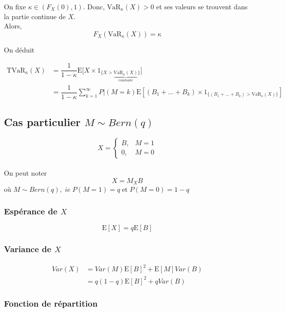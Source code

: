 On fixe \(\kappa \in (F_{X}(0),1)\). Donc, \(\text{VaR}_\kappa (X) >0\)
et ses valeurs se trouvent dans la partie continue de \(X\).\\
Alors, \[
F_X\left (\text{VaR}_\kappa (X) \right )=\kappa
\]

On déduit

\begin{align*}
\text{TVaR}_\kappa (X)&=\dfrac{1}{1-\kappa} \text{E}\big [X\times 1_{\{X>\underbrace{\text{VaR}_\kappa(X) }_{\text{constante}}\}}\big ]\\
& =\dfrac{1}{1-\kappa}\sum^\infty_{k=1} P|(M=k) \text{E}\left [(B_1+ \dots+ B_k)\times 1_{\{(B_1+ \dots+ B_k)> \text{VaR}_\kappa(X) \}}\right ]
\end{align*}

\subsection{Cas particulier \(M \sim Bern(q)\)}\label{cas-particulier-m-sim-bernq}

\[X=\begin{cases}
B,& M=1\\
0,& M=0
\end{cases}
\]
\\

On peut noter \[
X =M_X B
\] où \(M \sim Bern(q), \; ie\; P(M=1)=q\; \text{et}\; P(M=0)=1-q\)

\subsubsection*{Espérance de \(X\)}\label{esperance-de-x-1}

\[
\text{E}[X]=q\text{E}[B]
\]

\subsubsection*{Variance de \(X\)}\label{variance-de-x-1}

\begin{align*}
Var(X)& = Var(M)\text{E}[B]^2+\text{E}[M]Var(B)\\
& =q(1-q)\text{E}[B]^2+qVar(B)
\end{align*}

\subsubsection*{Fonction de répartition}\label{fonction-de-repartition-1}

